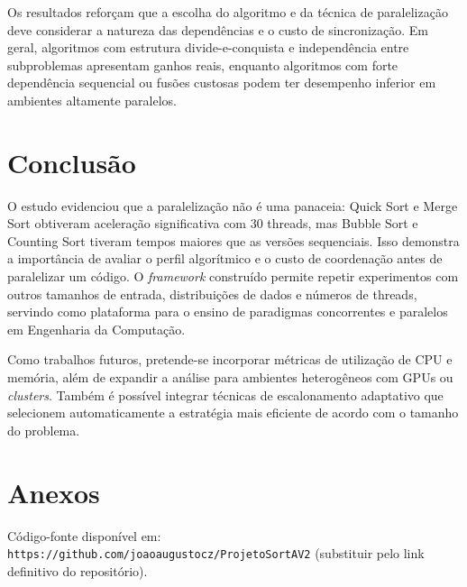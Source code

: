 \documentclass[11pt,twoside,a4paper]{article}
\begin{document}
\par Os resultados reforçam que a escolha do algoritmo e da técnica de paralelização deve considerar a natureza das dependências e o custo de sincronização. Em geral, algoritmos com estrutura divide-e-conquista e independência entre subproblemas apresentam ganhos reais, enquanto algoritmos com forte dependência sequencial ou fusões custosas podem ter desempenho inferior em ambientes altamente paralelos.

\section{Conclusão}
\par O estudo evidenciou que a paralelização não é uma panaceia: Quick Sort e Merge Sort obtiveram aceleração significativa com 30 threads, mas Bubble Sort e Counting Sort tiveram tempos maiores que as versões sequenciais. Isso demonstra a importância de avaliar o perfil algorítmico e o custo de coordenação antes de paralelizar um código. O \textit{framework} construído permite repetir experimentos com outros tamanhos de entrada, distribuições de dados e números de threads, servindo como plataforma para o ensino de paradigmas concorrentes e paralelos em Engenharia da Computação.

\par Como trabalhos futuros, pretende-se incorporar métricas de utilização de CPU e memória, além de expandir a análise para ambientes heterogêneos com GPUs ou \textit{clusters}. Também é possível integrar técnicas de escalonamento adaptativo que selecionem automaticamente a estratégia mais eficiente de acordo com o tamanho do problema.








\section*{Anexos}
\par Código-fonte disponível em: \texttt{https://github.com/joaoaugustocz/ProjetoSortAV2} (substituir pelo link definitivo do repositório).

\end{document}
